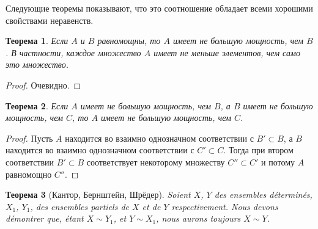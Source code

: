 \documentclass{article}
\newtheorem{theorem}{Теорема}[section]
\begin{document}
Следующие теоремы показывают, что это соотношение обладает всеми хорошими свойствами неравенств.

\begin{theorem}
Если \(A\) и \(B\) равномощны, то \(A\) имеет не большую мощность, чем \(B\). В частности, каждое множество \(A\) имеет не меньше элементов, чем само это множество.
\end{theorem}

\begin{proof}
Очевидно.
\end{proof}

\begin{theorem}
Если \(A\) имеет не большую мощность, чем \(B\), а \(B\) имеет не большую мощность, чем \(C\), то \(A\) имеет не большую мощность, чем \(C\).
\end{theorem}

\begin{proof}
Пусть \(A\) находится во взаимно однозначном соответствии с \(B' \subset B\), а \(B\) находится во взаимно однозначном соответствии с \(C' \subset C\). Тогда при втором соответствии \(B' \subset B\) соответствует некоторому множеству \(C'' \subset C'\) и потому \(A\) равномощно \(C''\).
\end{proof}

\begin{theorem}[Кантор, Бернштейн, Шрёдер]
Soient \(X\), \(Y\) des ensembles déterminés, \(X_1\), \(Y_1\), des ensembles partiels de \(X\) et de \(Y\) respectivement. Nous devons démontrer que, étant \(X \sim Y_1\), et \(Y \sim X_1\), nous aurons toujours \(X \sim Y\).
\end{theorem}
\end{document}
